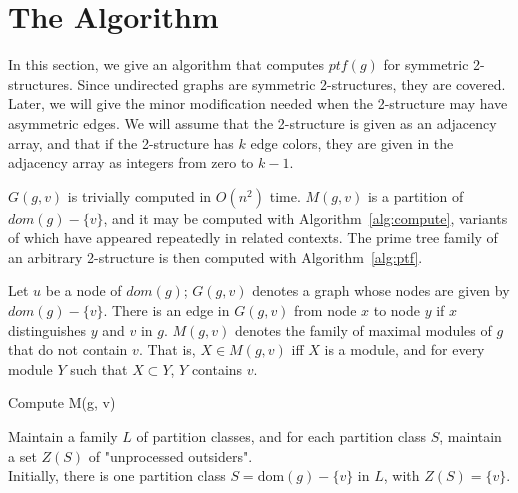 \section{The Algorithm}\label{sec:the-algorithm}

In this section, we give an algorithm that computes $ptf(g)$ for symmetric 2-structures.
Since undirected graphs are symmetric 2-structures, they are covered.
Later, we will give the minor modification needed when the 2-structure may have asymmetric edges.
We will assume that the 2-structure is given as an adjacency array, and that if the 2-structure has $k$ edge colors, they are given in the adjacency array as integers from zero to $k-1$.

$G(g, v)$ is trivially computed in $O(n^2)$ time. $M(g, v)$ is a partition of $dom(g) - \{v\}$, and it may be computed with Algorithm~\ref{alg:compute}, variants of which have appeared repeatedly in related contexts.
The prime tree family of an arbitrary 2-structure is then computed with Algorithm~\ref{alg:ptf}.


\begin{mydef}
    \label{def:3-1}
    Let $u$ be a node of $dom(g)$; $G(g, v)$ denotes a graph whose nodes are given by $dom(g) - \{v\}$.
    There is an edge in $G(g, v)$ from node $x$ to node $y$ if $x$ distinguishes $y$ and $v$ in $g$.
    $M(g,v)$ denotes the family of maximal modules of $g$ that do not contain $v$.
    That is, $X \in M(g, v)$ iff $X$ is a module, and for every module $Y$ such that $X \subset Y$, $Y$ contains $v$.
\end{mydef}


\begin{algorithm}[H]
    \label{alg:compute}
    \SetAlgoLined
    \caption{Compute M(g, v)}
    Maintain a family $L$ of partition classes, and for each partition class $S$, maintain a set $Z(S)$ of "unprocessed outsiders".\\
    Initially, there is one partition class $S = \text{dom}(g) - \{v\}$ in $L$, with $Z(S) = \{v\}$.

\end{algorithm}


